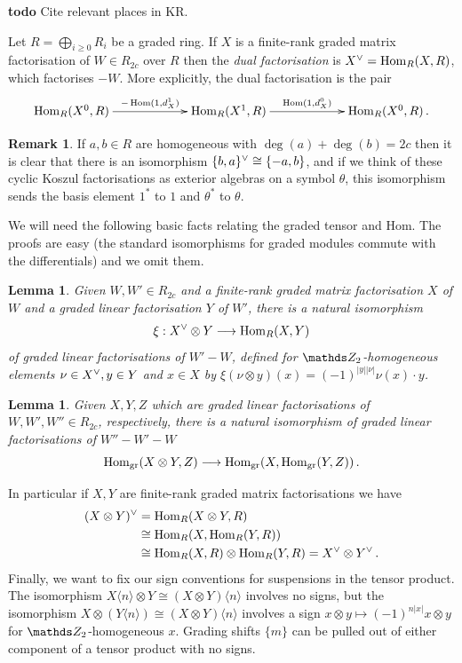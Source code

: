 \documentclass{compositio}
\newtheorem{lemma}[theorem]{Lemma}
\theoremstyle{definition}
\newtheorem{remark}[theorem]{Remark}
\numberwithin{equation}{section}
\def\Hom{\operatorname{Hom}}
\begin{document}
\textbf{todo} Cite relevant places in KR.

Let $R = \bigoplus_{i \ge 0} R_i$ be a graded ring. If $X$ is a finite-rank graded matrix factorisation of $W \in R_{2c}$ over $R$ then the \emph{dual factorisation} is $X\mdual = \Hom_R(X,R)$, which factorises $-W$. More explicitly, the dual factorisation is the pair
\[
\xymatrix@C+3pc{
\Hom_R(X^0, R) \ar[r]^-{-\Hom(1, d^1_X)} & \Hom_R(X^1,R) \ar[r]^-{\Hom(1,d^0_X)} & \Hom_R(X^0, R) \, .
}
\]

\begin{remark}\label{remark:dual_koszul_cyclic} If $a,b \in R$ are homogeneous with $\deg(a) + \deg(b) = 2c$ then it is clear that there is an isomorphism $\{ b, a \}^{\vee} \cong \{-a, b\}$, and if we think of these cyclic Koszul factorisations as exterior algebras on a symbol $\theta$, this isomorphism sends the basis element $1^*$ to $1$ and $\theta^*$ to $\theta$.
\end{remark}

We will need the following basic facts relating the graded tensor and Hom. The proofs are easy (the standard isomorphisms for graded modules commute with the differentials) and we omit them.

\begin{lemma}\label{lemma:homdual} Given $W, W' \in R_{2c}$ and a finite-rank graded matrix factorisation $X$ of $W$ and a graded linear factorisation $Y$ of $W'$, there is a natural isomorphism
\[
\xi: X\mdual \otimes Y \lto \Hom_R(X,Y)
\]
of graded linear factorisations of $W' - W$, defined for $\Ztwo$-homogeneous elements $\nu \in X^{\vee}, y \in Y$ and $x \in X$ by $\xi( \nu \otimes y )(x) = (-1)^{|y||\nu|} \nu(x) \cdot y$.
\end{lemma}

\begin{lemma} Given $X,Y,Z$ which are graded linear factorisations of $W, W', W'' \in R_{2c}$, respectively, there is a natural isomorphism of graded linear factorisations of $W'' - W' - W$
\[
\Hom_{\text{gr}}(X \otimes Y, Z) \lto \Hom_{\text{gr}}(X, \Hom_{\text{gr}}(Y,Z)) \, .
\]
\end{lemma}

In particular if $X, Y$ are finite-rank graded matrix factorisations we have
\begin{align}
(X \otimes Y)\mdual &= \Hom_R(X \otimes Y, R) \nonumber \\
&\cong \Hom_R(X, \Hom_R(Y,R)) \nonumber \\
&\cong \Hom_R(X,R) \otimes \Hom_R(Y,R) = X\mdual \otimes Y\mdual \, . \label{eq:dual_tensor}
\end{align}
Finally, we want to fix our sign conventions for suspensions in the tensor product. The isomorphism $X\langle n \rangle \otimes Y \cong (X \otimes Y)\langle n \rangle$ involves no signs, but the isomorphism $X \otimes (Y \langle n \rangle) \cong (X \otimes Y)\langle n \rangle$ involves a sign $x \otimes y \longmapsto (-1)^{n|x|} x \otimes y$ for $\Ztwo$-homogeneous $x$. Grading shifts $\{ m \}$ can be pulled out of either component of a tensor product with no signs.
\\
\end{document}
